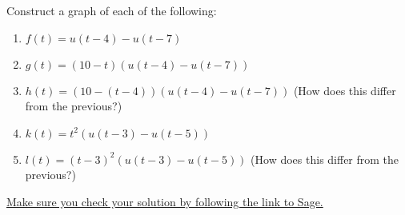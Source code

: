 {\begin{problem}
 Construct a graph of each of the following:
\begin{enumerate}
 \item $f(t) = u(t-4) - u(t-7)$
 \item $g(t) = (10-t)(u(t-4) - u(t-7))$
 \item $h(t) = (10-(t-4))(u(t-4) - u(t-7))$ (How does this differ from the previous?)
 \item $k(t) = t^2 (u(t-3) - u(t-5))$
 \item $l(t) = (t-3)^2( u(t-3) - u(t-5))$ (How does this differ from the previous?)
\end{enumerate}
\href{http://aleph.sagemath.org/?z=eJwrSyzSUC9R1-RK0yjRtNUwNNAt0dTSyEhNLMsszkxJ1SjRNdHUReaaa2pycRXk5JdogHToaJToGOhYaGoCAP0RFH0=&lang=sage}{Make sure you check your solution by following the link to Sage.}
\end{problem}

}


